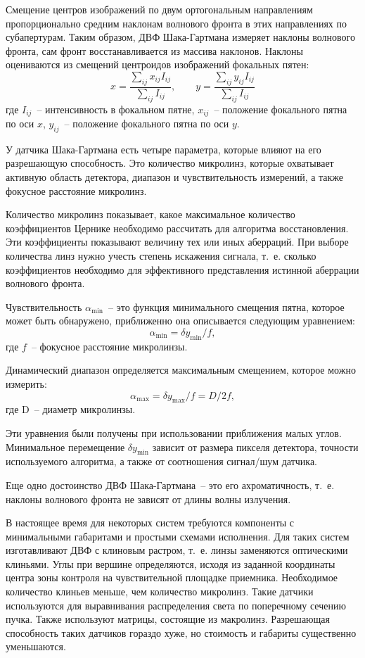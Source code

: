 \documentclass[pscyr,titlepage]{hedreport}
\begin{document}
Смещение центров изображений по двум ортогональным направлениям пропорционально
средним наклонам волнового фронта в этих направлениях по субапертурам. Таким
образом, ДВФ Шака-Гартмана измеряет наклоны волнового фронта, сам фронт
восстанавливается из массива наклонов. Наклоны оцениваются из смещений
центроидов изображений фокальных пятен:
\[
  x = \frac{\sum\limits_{ij} x_{ij} I_{ij}}{\sum\limits_{ij} I_{ij}}, \qquad
    y = \frac{\sum\limits_{ij} y_{ij} I_{ij}}{\sum\limits_{ij} I_{ij}}
\]
где \( I_{ij} \)~-- интенсивность в фокальном пятне, \( x_{ij} \)~-- положение
фокального пятна по оси \( x \), \( y_{ij} \)~-- положение фокального пятна по
оси \( y \).

У датчика Шака-Гартмана есть четыре параметра, которые влияют на его разрешающую
способность. Это количество микролинз, которые охватывает активную область
детектора, диапазон и чувствительность измерений, а также фокусное расстояние
микролинз.
 
Количество микролинз показывает, какое максимальное количество коэффициентов
Цернике необходимо рассчитать для алгоритма восстановления. Эти коэффициенты
показывают величину тех или иных аберраций. При выборе количества линз нужно
учесть степень искажения сигнала, т.~е. сколько коэффициентов необходимо для
эффективного представления истинной аберрации волнового фронта.

Чувствительность \( \alpha_{\min} \)~-- это функция минимального смещения пятна,
которое может быть обнаружено, приближенно она описывается следующим уравнением:
\[
  \alpha_{\min} = \delta y_{\min} / f,
\]
где \( f \)~-- фокусное расстояние микролинзы.
 
Динамический диапазон определяется максимальным смещением, которое можно
измерить:
\[
  \alpha_{\max} = \delta y_{\max} / f = D / 2f,
\]
где D~-- диаметр микролинзы.

Эти уравнения были получены при использовании приближения малых углов.
Минимальное перемещение \( \delta y_{\min} \) зависит от размера пикселя
детектора, точности используемого алгоритма, а также от соотношения сигнал/шум
датчика.
 
Еще одно достоинство ДВФ Шака-Гартмана~-- это его ахроматичность, т.~е. наклоны
волнового фронта не зависят от длины волны излучения.

В настоящее время для некоторых систем требуются компоненты с минимальными
габаритами и простыми схемами исполнения. Для таких систем изготавливают ДВФ с
клиновым растром, т.~е. линзы заменяются оптическими клиньями. Углы при вершине
определяются, исходя из заданной координаты центра зоны контроля на
чувствительной площадке приемника. Необходимое количество клиньев меньше, чем
количество микролинз. Такие датчики используются для выравнивания распределения
света по поперечному сечению пучка. Также используют матрицы, состоящие из
макролинз. Разрешающая способность таких датчиков гораздо хуже, но стоимость и
габариты существенно уменьшаются.
\end{document}
